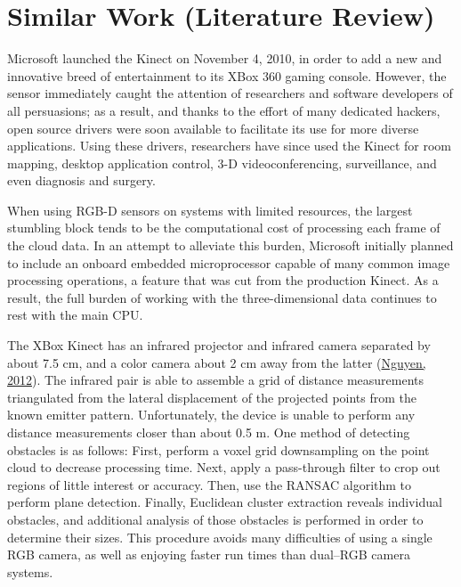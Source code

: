 \documentclass[12pt]{report}
\begin{document}
\section{Similar Work (Literature Review)}
Microsoft launched the Kinect on November 4, 2010, in order to add a new and innovative breed of entertainment to its XBox 360 gaming console.  However, the sensor immediately caught the attention of researchers and software developers of all persuasions; as a result, and thanks to the effort of many dedicated hackers, open source drivers were soon available to facilitate its use for more diverse applications.  Using these drivers, researchers have since used the Kinect for room mapping, desktop application control, 3-D videoconferencing, surveillance, and even diagnosis and surgery.

When using RGB-D sensors on systems with limited resources, the largest stumbling block tends to be the computational cost of processing each frame of the cloud data.  In an attempt to alleviate this burden, Microsoft initially planned to include an onboard embedded microprocessor capable of many common image processing operations, a feature that was cut from the production Kinect.  As a result, the full burden of working with the three-dimensional data continues to rest with the main CPU.

The XBox Kinect has an infrared projector and infrared camera separated by about 7.5 cm, and a color camera about 2 cm away from the latter (\hyperref[bib:nguyen]{Nguyen, 2012}).  The infrared pair is able to assemble a grid of distance measurements triangulated from the lateral displacement of the projected points from the known emitter pattern.  Unfortunately, the device is unable to perform any distance measurements closer than about 0.5 m.  One method of detecting obstacles is as follows:  First, perform a voxel grid downsampling on the point cloud to decrease processing time.  Next, apply a pass-through filter to crop out regions of little interest or accuracy.  Then, use the RANSAC algorithm to perform plane detection.  Finally, Euclidean cluster extraction reveals individual obstacles, and additional analysis of those obstacles is performed in order to determine their sizes.  This procedure avoids many difficulties of using a single RGB camera, as well as enjoying faster run times than dual--RGB camera systems.
\end{document}
